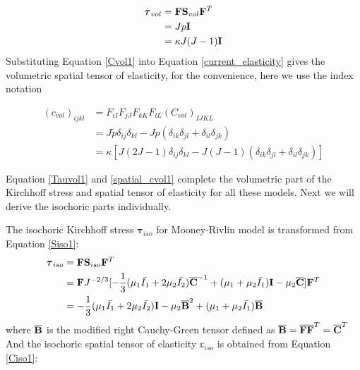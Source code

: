\begin{subequations}
\label{Tauvol1}
\begin{align}
\boldsymbol{\tau}_{vol} &= \bold{F}\bold{S}_{vol}{\bold{F}}^T \\
				    &= Jp\bold{I} \label{Tauvol11}\\
		      		    &= \kappa J(J-1) \bold{I} \label{Tauvol12}
\end{align}
\end{subequations}
Substituting Equation \ref{Cvol1} into Equation \ref{current_elasticity} gives the volumetric spatial tensor of elasticity, for the convenience, here we use the index notation

\begin{subequations} \label{spatial_cvol1}
\begin{align}
(c_{vol})_{ijkl} &= F_{iI}F_{jJ}F_{kK}F_{lL}(C_{vol})_{IJKL} \\
&= J\tilde{p}\delta_{ij}\delta_{kl} - Jp(\delta_{ik}\delta_{jl} + \delta_{il}\delta_{jk}) \label{spatial_cvol11} \\
&= \kappa[J(2J-1)\delta_{ij}\delta_{kl} - J(J-1)(\delta_{ik}\delta_{jl} + \delta_{il}\delta_{jk})] \label{spatial_cvol12}
\end{align}
\end{subequations} 

Equation \ref{Tauvol1} and \ref{spatial_cvol1} complete the volumetric part of the Kirchhoff stress and spatial tensor of elasticity for all these models. Next we will derive the isochoric parts individually.

The isochoric Kirchhoff stress $\boldsymbol{\tau}_{iso}$ for Mooney-Rivlin model is transformed from Equation \ref{Siso1}:
\begin{equation} \label{Tauiso1}
\begin{split}
\boldsymbol{\tau}_{iso} &= \bold{F}\bold{S}_{iso}{\bold{F}}^T \\
	   			    &= \bold{F}  J^{-2/3} [    - \frac{1}{3}(\mu_1\bar{I_1} + 2\mu_2\bar{I_2}) \overline{\bold{C}}^{-1}  + (\mu_1 + \mu_2\bar{I_1})\bold{I} - \mu_2\overline{\bold{C}} ]   \bold{F}^T \\
				    &= - \frac{1}{3}(\mu_1\bar{I_1} + 2\mu_2\bar{I_2})\bold{I} - \mu_2{\overline{\bold{B}}}^2 + (\mu_1 + \mu_2\bar{I_1}){\overline{\bold{B}}}
\end{split}
\end{equation}
where $\overline{\bold{B}}$ is the modified right Cauchy-Green tensor defined as $\overline{\bold{B}} = \overline{\bold{F}}\overline{\bold{F}}^T = \overline{\bold{C}}^T$
And the isochoric spatial tensor of elasticity $\mathbb{c}_{iso}$ is obtained from Equation \ref{Ciso1}:

